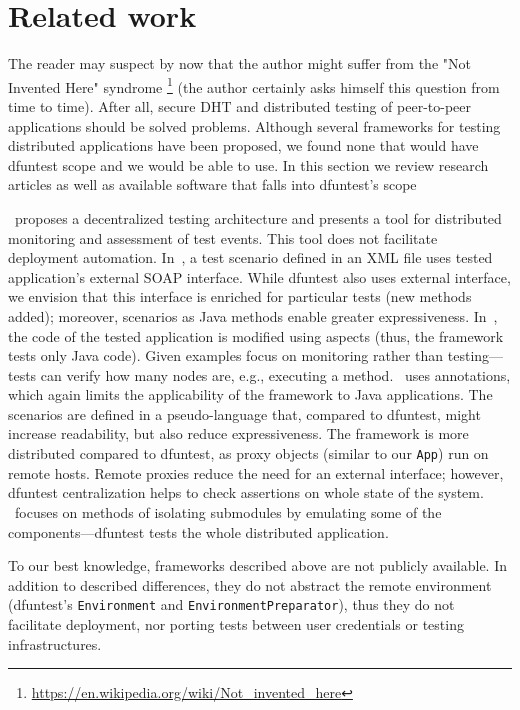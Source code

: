 \section{Related work}
The reader may suspect by now that the author might suffer from the "Not Invented Here" syndrome \footnote{\url{https://en.wikipedia.org/wiki/Not\_invented\_here}} (the author certainly asks himself this question from time to time).
After all, secure DHT and distributed testing of peer-to-peer applications should be solved problems.
Although several frameworks for testing distributed applications have been proposed, we found none that would have dfuntest scope and we would be able to use.
In this section we review research articles as well as available software that falls into dfuntest's scope

\cite{ulr99}~proposes a decentralized testing architecture and presents a tool for distributed monitoring and assessment of test events. This tool does not facilitate deployment automation.
In~\cite{tsa03}, a test scenario defined in an XML file uses tested application's external SOAP interface. 
While dfuntest also uses external interface, we envision that this interface is enriched for particular tests (new methods  added); moreover, scenarios as Java methods enable greater expressiveness.
In~\cite{hug04}, the code of the tested application is modified using aspects (thus, the framework tests only Java code). 
Given examples focus on monitoring rather than testing---tests can verify how many nodes are, e.g., executing a method.
\cite{de10}~uses annotations, which again limits the applicability of the framework to Java applications. 
The scenarios are defined in a pseudo-language that, compared to dfuntest, might increase readability, but also reduce expressiveness.
The framework is more distributed compared to dfuntest, as proxy objects (similar to our \texttt{App}) run on remote hosts. 
Remote proxies reduce the need for an external interface; 
however, dfuntest centralization helps to check assertions on whole state of the system.
\cite{tor10}~focuses on methods of isolating submodules by emulating some of the components---dfuntest tests the whole distributed application. 

To our best knowledge, frameworks described above are not publicly available. In addition to described differences, they do not abstract the remote environment (dfuntest's \texttt{Environment} and \texttt{EnvironmentPreparator}), thus they do not facilitate deployment, nor porting tests between user credentials or testing infrastructures.

